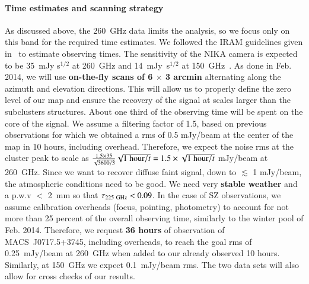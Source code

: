 \documentclass[11pt,a4paper,twoside,graphicx,color]{article}
\begin{document}
\paragraph{\large Time estimates and scanning strategy}
As discussed above, the 260~GHz data limits the analysis, so we focus only on this band for the required time estimates. We followed the IRAM guidelines given in~\cite{billot2014} to estimate observing times. The sensitivity of the NIKA camera is expected to be 35~mJy s$^{1/2}$ at 260~GHz and 14~mJy~s$^{1/2}$ at 150~GHz~\citep{catalano2014, billot2014}. As done in Feb. 2014, we will use {\bf on-the-fly scans of 6 $\times$ 3 arcmin} alternating along the azimuth and elevation directions. This will allow us to properly define the zero level of our map and ensure the recovery of the signal at scales larger than the subclusters structures. About one third of the observing time will be spent on the core of the signal. We assume a filtering factor of 1.5, based on previous observations for which we obtained a rms of 0.5 mJy/beam at the center of the map in 10 hours, including overhead. Therefore, we expect the noise rms at the cluster peak to scale as $\frac{1.5 \times 35}{\sqrt{3600/3}} \sqrt{1 \ {\rm hour} / t} = 1.5 \times \sqrt{1 \ {\rm hour} / t}$ mJy/beam at 260~GHz. Since we want to recover diffuse faint signal, down to $\lesssim$ 1 mJy/beam, the atmospheric conditions need to be good. We need very {\bf stable weather} and a p.w.v $<$ 2~mm so that $\tau_{225\ {\rm GHz}} < 0.09$. In the case of SZ observations, we assume calibration overheads (focus, pointing, photometry) to account for not more than 25 percent of the overall observing time, similarly to the winter pool of Feb. 2014. Therefore, we request {\bf 36 hours} of observation of \mbox{MACS~J0717.5+3745}, including overheads, to reach the goal rms of 0.25~mJy/beam at 260~GHz when added to our already observed 10 hours. Similarly, at 150~GHz we expect 0.1~mJy/beam rms. The two data sets will also allow for cross checks of our results.

\newpage
\end{document}
